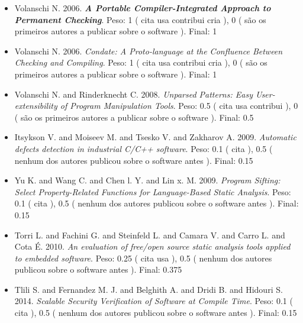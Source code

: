 \begin{itemize}
\item Volanschi N.
      2006.
        \textbf{\textit{ A Portable Compiler-Integrated Approach to Permanent Checking}}.
      Peso:
      1 (
          cita
          usa
          contribui
          cria
      ),
      0 (
são os primeiros autores a publicar sobre o software
      ).
      Final:
      1

\item Volanschi N.
      2006.
        \textit{ Condate: A Proto-language at the Confluence Between Checking and Compiling}.
      Peso:
      1 (
          cita
          usa
          contribui
          cria
      ),
      0 (
são os primeiros autores a publicar sobre o software
      ).
      Final:
      1

\item Volanschi N. and Rinderknecht C.
      2008.
        \textit{ Unparsed Patterns: Easy User-extensibility of Program Manipulation Tools}.
      Peso:
      0.5 (
          cita
          usa
          contribui
      ),
      0 (
são os primeiros autores a publicar sobre o software
      ).
      Final:
      0.5

\item Itsykson V. and Moiseev M. and Tsesko V. and Zakharov A.
      2009.
        \textit{ Automatic defects detection in industrial C/C++ software}.
      Peso:
      0.1 (
          cita
      ),
      0.5 (
nenhum dos autores publicou sobre o software antes
      ).
      Final:
      0.15

\item Yu K. and Wang C. and Chen l. Y. and Lin x. M.
      2009.
        \textit{ Program Sifting: Select Property-Related Functions for Language-Based Static Analysis}.
      Peso:
      0.1 (
          cita
      ),
      0.5 (
nenhum dos autores publicou sobre o software antes
      ).
      Final:
      0.15

\item Torri L. and Fachini G. and Steinfeld L. and Camara V. and Carro L. and Cota É.
      2010.
        \textit{ An evaluation of free/open source static analysis tools applied to embedded software}.
      Peso:
      0.25 (
          cita
          usa
      ),
      0.5 (
nenhum dos autores publicou sobre o software antes
      ).
      Final:
      0.375

\item Tlili S. and Fernandez M. J. and Belghith A. and Dridi B. and Hidouri S.
      2014.
        \textit{ Scalable Security Verification of Software at Compile Time}.
      Peso:
      0.1 (
          cita
      ),
      0.5 (
nenhum dos autores publicou sobre o software antes
      ).
      Final:
      0.15

\end{itemize}

